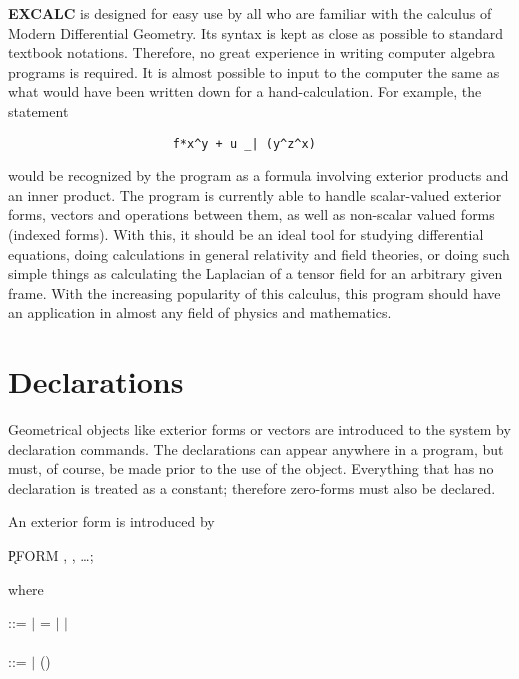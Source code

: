\documentclass[11pt,letterpaper]{book}
\makeatletter
\newcommand{\underscore}{\_}
\newcommand{\ttindex}[1]{{\renewcommand{\_}{\protect\underscore}%
                          \index{#1@{\tt #1}}}}
\makeatother
\begin{document}
\ttindex{EXCALC}

{\bf EXCALC} is designed for easy use by all who are familiar with the
calculus of Modern Differential Geometry.  Its syntax is kept as close
as possible to standard textbook notations.  Therefore, no great
experience in writing computer algebra programs is required.  It is
almost possible to input to the computer the same as what would have
been written down for a hand-calculation.  For example, the statement

{\small\begin{verbatim}
                       f*x^y + u _| (y^z^x)
\end{verbatim}}

would be recognized by the program as a formula involving exterior
products and an inner product.  The program is currently able to
handle scalar-valued exterior forms, vectors and operations between
them, as well as non-scalar valued forms (indexed forms).  With this,
it should be an ideal tool for studying differential equations,
doing calculations in general relativity and field theories, or doing
such simple things as calculating the Laplacian of a tensor field for
an arbitrary given frame.  With the increasing popularity of this
calculus, this program should have an application in almost any field
of physics and mathematics.

\section{Declarations}

Geometrical objects like exterior forms or vectors are introduced to the
system by declaration commands.  The declarations can appear anywhere in
a program, but must, of course, be made prior to the use of the object.
Everything that has no declaration is treated as a constant; therefore
zero-forms must also be declared.

An exterior form is introduced by\label{PFORM}

\hspace*{2em} \k{PFORM} , , \ldots;

where

\begin{tabbing}
 ::=  $\mid$ = $\mid$   $\mid$ \\
 \\
 ::=  $\mid$ ()
\end{tabbing}
\end{document}

